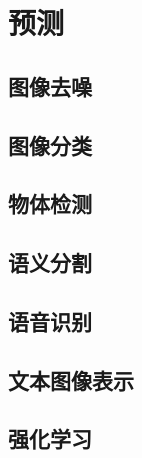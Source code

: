 \chapter{预测}\label{ch6}

\section{图像去噪}\label{sec6.1}

\section{图像分类}\label{sec6.2}

\section{物体检测}\label{sec6.3}

\section{语义分割}\label{sec6.4}

\section{语音识别}\label{sec6.5}

\section{文本图像表示}\label{sec6.6}

\section{强化学习}\label{sec6.7}